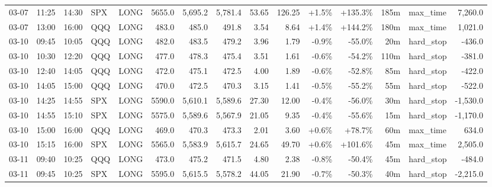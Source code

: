 \documentclass[11pt,a4paper,twoside]{article}
\begin{document}
\begin{landscape}
\begin{center}
\begin{longtable}{>{\color{txtmain}}l l l l l r r r r r r r r >{\color{txtmain}}l r}
03-07 & 11:25 & 14:30 & SPX & LONG & 5655.0 & 5,695.2 & 5,781.4 & 53.65 & 126.25 & \textcolor{wingreen}{+1.5\%} & \textcolor{wingreen}{+135.3\%} & 185m & max\_time & \textcolor{wingreen}{7,260.0} \\
03-07 & 13:00 & 16:00 & QQQ & LONG & 483.0 & 485.0 & 491.8 & 3.54 & 8.64 & \textcolor{wingreen}{+1.4\%} & \textcolor{wingreen}{+144.2\%} & 180m & max\_time & \textcolor{wingreen}{1,021.0} \\
03-10 & 09:45 & 10:05 & QQQ & LONG & 482.0 & 483.5 & 479.2 & 3.96 & 1.79 & \textcolor{lossred}{-0.9\%} & \textcolor{lossred}{-55.0\%} & 20m & hard\_stop & \textcolor{lossred}{-436.0} \\
03-10 & 10:30 & 12:20 & QQQ & LONG & 477.0 & 478.3 & 475.4 & 3.51 & 1.61 & \textcolor{lossred}{-0.6\%} & \textcolor{lossred}{-54.2\%} & 110m & hard\_stop & \textcolor{lossred}{-381.0} \\
03-10 & 12:40 & 14:05 & QQQ & LONG & 472.0 & 475.1 & 472.5 & 4.00 & 1.89 & \textcolor{lossred}{-0.6\%} & \textcolor{lossred}{-52.8\%} & 85m & hard\_stop & \textcolor{lossred}{-422.0} \\
03-10 & 14:05 & 15:00 & QQQ & LONG & 470.0 & 472.5 & 470.3 & 3.15 & 1.41 & \textcolor{lossred}{-0.5\%} & \textcolor{lossred}{-55.2\%} & 55m & hard\_stop & \textcolor{lossred}{-522.0} \\
03-10 & 14:25 & 14:55 & SPX & LONG & 5590.0 & 5,610.1 & 5,589.6 & 27.30 & 12.00 & \textcolor{lossred}{-0.4\%} & \textcolor{lossred}{-56.0\%} & 30m & hard\_stop & \textcolor{lossred}{-1,530.0} \\
03-10 & 14:55 & 15:10 & SPX & LONG & 5575.0 & 5,589.6 & 5,567.9 & 21.05 & 9.35 & \textcolor{lossred}{-0.4\%} & \textcolor{lossred}{-55.6\%} & 15m & hard\_stop & \textcolor{lossred}{-1,170.0} \\
03-10 & 15:00 & 16:00 & QQQ & LONG & 469.0 & 470.3 & 473.3 & 2.01 & 3.60 & \textcolor{wingreen}{+0.6\%} & \textcolor{wingreen}{+78.7\%} & 60m & max\_time & \textcolor{wingreen}{634.0} \\
03-10 & 15:15 & 16:00 & SPX & LONG & 5565.0 & 5,583.9 & 5,615.7 & 24.65 & 49.70 & \textcolor{wingreen}{+0.6\%} & \textcolor{wingreen}{+101.6\%} & 45m & max\_time & \textcolor{wingreen}{2,505.0} \\
03-11 & 09:40 & 10:25 & QQQ & LONG & 473.0 & 475.2 & 471.5 & 4.80 & 2.38 & \textcolor{lossred}{-0.8\%} & \textcolor{lossred}{-50.4\%} & 45m & hard\_stop & \textcolor{lossred}{-484.0} \\
03-11 & 09:45 & 10:25 & SPX & LONG & 5595.0 & 5,615.5 & 5,578.2 & 44.05 & 21.90 & \textcolor{lossred}{-0.7\%} & \textcolor{lossred}{-50.3\%} & 40m & hard\_stop & \textcolor{lossred}{-2,215.0} \\

\end{longtable}
\end{center}
\end{landscape}
\end{document}
